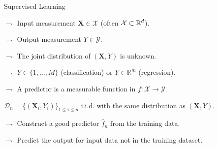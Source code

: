 \documentclass[xcolor={usenames,dvipsnames},handout]{beamer}
\begin{document}
\begin{frame}{Supervised  Learning}

$\rightharpoondown$ \alert{Input} measurement $\textbf{X}  \in \mathcal{X}$ (often $\mathcal{X} \subset \mathbb{R}^d$).

\vspace{.1cm}

$\rightharpoondown$ \alert{Output} measurement $Y \in \mathcal{Y}$. 

\vspace{.1cm}

$\rightharpoondown$ The joint distribution of $(\textbf{X},Y)$ is  \alert{unknown}.

\vspace{.1cm}

$\rightharpoondown$  $Y \in \{1,\ldots,M\}$ (classification) or $Y \in \mathbb{R}^m$ (regression).

\vspace{.1cm}

$\rightharpoondown$ A \alert{predictor} is a measurable function in $ f:\mathcal{X} \to \mathcal{Y}$.

\vspace{.5cm}


$\mathcal{D}_n=\{(\textbf{X}_i, Y_i)\}_{1\leq i \leq n}$ i.i.d. with the same distribution as $(\textbf{X},Y)$.




\vspace{.5cm}


$\rightharpoondown$  Construct a \alert{good} predictor $\widehat{f}_n$ from the training data.

\vspace{.1cm}

$\rightharpoondown$ Predict the output for \alert{input data not in the training dataset}.

%

\end{frame}
\end{document}
